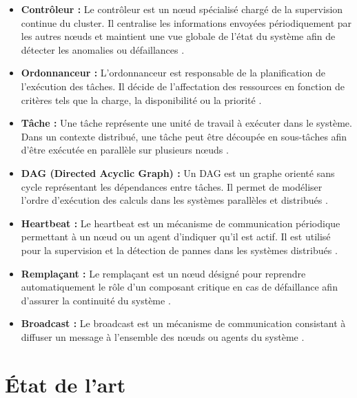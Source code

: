 \documentclass[12pt,a4paper]{report}
\begin{document}
\begin{itemize}
    \item[$\bullet$] \textbf{Contrôleur :} Le contrôleur est un nœud spécialisé chargé de la supervision continue du cluster. Il centralise les informations envoyées périodiquement par les autres nœuds et maintient une vue globale de l'état du système afin de détecter les anomalies ou défaillances \cite{tanenbaum_ds}.

    \item[$\bullet$] \textbf{Ordonnanceur :} L'ordonnanceur est responsable de la planification de l'exécution des tâches. Il décide de l'affectation des ressources en fonction de critères tels que la charge, la disponibilité ou la priorité \cite{topcuoglu}.

    \item[$\bullet$] \textbf{Tâche :} Une tâche représente une unité de travail à exécuter dans le système. Dans un contexte distribué, une tâche peut être découpée en sous-tâches afin d'être exécutée en parallèle sur plusieurs nœuds \cite{topcuoglu}.

    \item[$\bullet$] \textbf{DAG (Directed Acyclic Graph) :} Un DAG est un graphe orienté sans cycle représentant les dépendances entre tâches. Il permet de modéliser l'ordre d'exécution des calculs dans les systèmes parallèles et distribués \cite{topcuoglu}.

    \item[$\bullet$] \textbf{Heartbeat :} Le heartbeat est un mécanisme de communication périodique permettant à un nœud ou un agent d'indiquer qu'il est actif. Il est utilisé pour la supervision et la détection de pannes dans les systèmes distribués \cite{tanenbaum_ds, kubernetes}.

    \item[$\bullet$] \textbf{Remplaçant :} Le remplaçant est un nœud désigné pour reprendre automatiquement le rôle d'un composant critique en cas de défaillance afin d'assurer la continuité du système \cite{bully}.

    \item[$\bullet$] \textbf{Broadcast :} Le broadcast est un mécanisme de communication consistant à diffuser un message à l'ensemble des nœuds ou agents du système \cite{tanenbaum_ds}.

\end{itemize}

\section{État de l'art}
\end{document}
